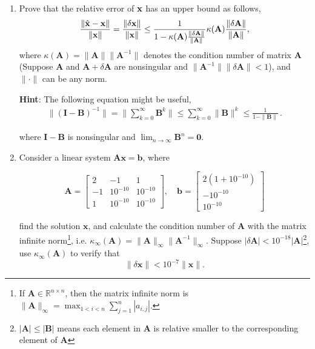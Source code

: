\documentclass[english,onecolumn]{IEEEtran}
\begin{document}
\begin{enumerate}
    \item Prove that the relative error of $\bf{x}$ has an upper bound as follows,
    \begin{equation*}
        \frac{\|\hat{\mathbf{x}}-\mathbf{x}\|}{\|\mathbf{x}\|} = \frac{\|\delta \bf{x}\|}{\|\bf{x}\|} \leq \frac{1}{1-\kappa(\mathbf{A})\frac{\|\delta \mathbf{A}\|}{\|\mathbf{A}\|}}\kappa(\mathbf{A})\frac{\|\delta \mathbf{A}\|}{\|\mathbf{A}\|},
    \end{equation*}
    where $\kappa(\mathbf{A}) = \|\mathbf{A}\|\|\mathbf{A}^{-1}\|$ denotes the condition number of matrix $\mathbf{A}$ (Suppose $\mathbf{A}$ and $\mathbf{A}+\delta \mathbf{A}$ are nonsingular and $\|\mathbf{A}^{-1}\|\|\delta \mathbf{A}\|<1$), and $\|\cdot\|$ can be any norm.
    
    \textbf{Hint}: The following equation might be useful,
    \begin{align*}
        \|(\mathbf{I}-\mathbf{B})^{-1}\| =  \|\sum_{k = 0}^{\infty} \mathbf{B}^k\| \leq \sum_{k = 0}^{\infty} \|\mathbf{B}\|^k \leq  \frac{1}{1-\|\mathbf{B}\|}\,.
    \end{align*}
    
    
    where $\mathbf{I}-\mathbf{B}$ is nonsingular and $\lim_{n\to \infty}\mathbf{B}^n = \mathbf{0}$.
    
    \item Consider a linear system $\mathbf{A}\mathbf{x} = \mathbf{b}$, where
    
    \[
        \mathbf{A} = \begin{bmatrix}2 & -1 & 1 \\ -1 &10^{-10} &10^{-10}\\ 1 & 10^{-10} & 10^{-10}  \end{bmatrix},\quad \mathbf{b} = \begin{bmatrix}2(1+10^{-10}) \\ -10^{-10} \\10^{-10} \end{bmatrix}
    \]
    
    find the solution $\mathbf{x}$, and calculate the condition number of $\mathbf{A}$ with the matrix infinite norm\footnote{If $\mathbf{A}\in\mathbb{R}^{n\times n}$, then the matrix infinite norm is  $\|\mathbf{A}\|_{\infty} = \max_{1<i<n}\sum_{j = 1}^n|a_{i,j}|$.}, i.e. $\kappa_\infty(\mathbf{A}) = \|\mathbf{A}\|_\infty\|\mathbf{A}^{-1}\|_\infty$. Suppose $|\delta\mathbf{A}|<10^{-18}|\mathbf{A}|$\footnote{$|\mathbf{A}|\leq |\mathbf{B}|$ means each element in $\mathbf{A}$ is relative smaller to the corresponding element of $\mathbf{A}$}, use $\kappa_\infty(\mathbf{A})$ to verify that 
    \[
        \|\delta \mathbf{x}\|< 10^{-7} \|\mathbf{x}\|. 
    \]
    

\end{enumerate}
\end{document}
